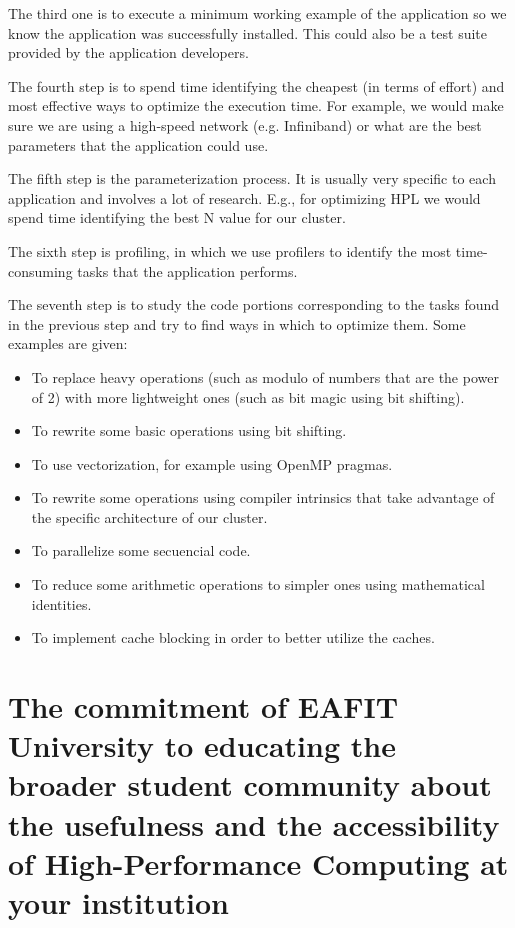 \documentclass[11pt,a4paper,twocolumn]{article}
\begin{document}
    The third one is to execute a minimum working example of the application so we know the application was successfully installed. This could also be a test suite provided by the application developers.

    The fourth step is to spend time identifying the cheapest (in terms of effort) and most effective ways to optimize the execution time. For example, we would make sure we are using a high-speed network (e.g. Infiniband) or what are the best parameters that the application could use.

    The fifth step is the parameterization process. It is usually very specific to each application and involves a lot of research. E.g., for optimizing HPL we would spend time identifying the best N value for our cluster.

    The sixth step is profiling, in which we use profilers to identify the most time-consuming tasks that the application performs.

    The seventh step is to study the code portions corresponding to the tasks found in the previous step and try to find ways in which to optimize them. Some examples are given:

    \begin{itemize}
        \item To replace heavy operations (such as modulo of numbers that are the power of 2) with more lightweight ones (such as bit magic using bit shifting).
        \item To rewrite some basic operations using bit shifting.
        \item To use vectorization, for example using OpenMP pragmas.
        \item To rewrite some operations using compiler intrinsics that take advantage of the specific architecture of our cluster.
        \item To parallelize some secuencial code.
        \item To reduce some arithmetic operations to simpler ones using mathematical identities.
        \item To implement cache blocking in order to better utilize the caches.
    \end{itemize}

    \section{The commitment of EAFIT University to educating the broader student community about the usefulness and the accessibility of High-Performance Computing at your institution}
\end{document}
